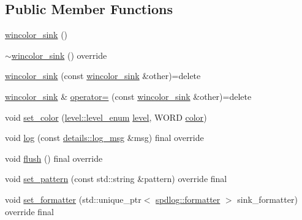 \subsection*{Public Member Functions}
\begin{DoxyCompactItemize}
\item 
\hyperlink{classspdlog_1_1sinks_1_1wincolor__sink_a4ed05c6780bc65806080c88202d80577}{wincolor\+\_\+sink} ()
\item 
\hyperlink{classspdlog_1_1sinks_1_1wincolor__sink_a229d666b7880d587aefa8c5d999acfb4}{$\sim$wincolor\+\_\+sink} () override
\item 
\hyperlink{classspdlog_1_1sinks_1_1wincolor__sink_a89e2ddbd1297c8c722d63277b458b5c1}{wincolor\+\_\+sink} (const \hyperlink{classspdlog_1_1sinks_1_1wincolor__sink}{wincolor\+\_\+sink} \&other)=delete
\item 
\hyperlink{classspdlog_1_1sinks_1_1wincolor__sink}{wincolor\+\_\+sink} \& \hyperlink{classspdlog_1_1sinks_1_1wincolor__sink_a54ca784b8f5e1ee9c2adcda3125c3515}{operator=} (const \hyperlink{classspdlog_1_1sinks_1_1wincolor__sink}{wincolor\+\_\+sink} \&other)=delete
\item 
void \hyperlink{classspdlog_1_1sinks_1_1wincolor__sink_a914a0d9aed02627be8cd287a2dee9916}{set\+\_\+color} (\hyperlink{namespacespdlog_1_1level_a35f5227e5daf228d28a207b7b2aefc8b}{level\+::level\+\_\+enum} \hyperlink{classspdlog_1_1sinks_1_1sink_ae59ca2b418c5cdfed1c04e49a444be1c}{level}, W\+O\+RD \hyperlink{color_8h_a80d1dc5f416b97f92939a4166d41203c}{color})
\item 
void \hyperlink{classspdlog_1_1sinks_1_1wincolor__sink_a64d98363a05d1a7a4f295f6de1b5cec1}{log} (const \hyperlink{structspdlog_1_1details_1_1log__msg}{details\+::log\+\_\+msg} \&msg) final override
\item 
void \hyperlink{classspdlog_1_1sinks_1_1wincolor__sink_a3746a35fc36218e76dc3080e52fe6233}{flush} () final override
\item 
void \hyperlink{classspdlog_1_1sinks_1_1wincolor__sink_a5032da6fc760507134a7d1eff1a20b0a}{set\+\_\+pattern} (const std\+::string \&pattern) override final
\item 
void \hyperlink{classspdlog_1_1sinks_1_1wincolor__sink_a48cc1a252565bdbb66b12ba2a40e62f9}{set\+\_\+formatter} (std\+::unique\+\_\+ptr$<$ \hyperlink{classspdlog_1_1formatter}{spdlog\+::formatter} $>$ sink\+\_\+formatter) override final
\end{DoxyCompactItemize}
